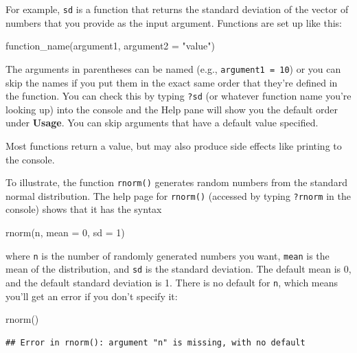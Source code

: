 \documentclass[
  oneside]{book}
\newenvironment{Shaded}{\begin{snugshade}}{\end{snugshade}}
\newcommand{\AttributeTok}[1]{\textcolor[rgb]{0.77,0.63,0.00}{#1}}
\newcommand{\DecValTok}[1]{\textcolor[rgb]{0.00,0.00,0.81}{#1}}
\newcommand{\FunctionTok}[1]{\textcolor[rgb]{0.00,0.00,0.00}{#1}}
\newcommand{\NormalTok}[1]{#1}
\newcommand{\StringTok}[1]{\textcolor[rgb]{0.31,0.60,0.02}{#1}}
\begin{document}
For example, \texttt{sd} is a function that returns the standard deviation of the vector of numbers that you provide as the input argument. Functions are set up like this:

\begin{Shaded}
\begin{Highlighting}[]
\FunctionTok{function\_name}\NormalTok{(argument1, }\AttributeTok{argument2 =} \StringTok{"value"}\NormalTok{)}
\end{Highlighting}
\end{Shaded}

The arguments in parentheses can be named (e.g., \texttt{argument1\ =\ 10}) or you can skip the names if you put them in the exact same order that they're defined in the function. You can check this by typing \texttt{?sd} (or whatever function name you're looking up) into the console and the Help pane will show you the default order under \textbf{Usage}. You can skip arguments that have a default value specified.

Most functions return a value, but may also produce side effects like printing to the console.

To illustrate, the function \texttt{rnorm()} generates random numbers from the standard normal distribution. The help page for \texttt{rnorm()} (accessed by typing \texttt{?rnorm} in the console) shows that it has the syntax

\begin{Shaded}
\begin{Highlighting}[]
\FunctionTok{rnorm}\NormalTok{(n, }\AttributeTok{mean =} \DecValTok{0}\NormalTok{, }\AttributeTok{sd =} \DecValTok{1}\NormalTok{)}
\end{Highlighting}
\end{Shaded}

where \texttt{n} is the number of randomly generated numbers you want, \texttt{mean} is the mean of the distribution, and \texttt{sd} is the standard deviation. The default mean is 0, and the default standard deviation is 1. There is no default for \texttt{n}, which means you'll get an error if you don't specify it:

\begin{Shaded}
\begin{Highlighting}[]
\FunctionTok{rnorm}\NormalTok{()}
\end{Highlighting}
\end{Shaded}

\begin{verbatim}
## Error in rnorm(): argument "n" is missing, with no default
\end{verbatim}
\end{document}
